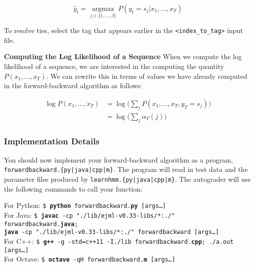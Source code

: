 \documentclass[11pt,addpoints,answers]{exam}
\numberwithin{equation}{section} %
\numberwithin{figure}{section} %
\numberwithin{table}{section} %
\newcommand \argmax {\operatorname*{argmax}}
\begin{document}
$$\hat{y}_t = \argmax_{j\in \{1,...,J\}} P(y_t = s_j\vert x_1,...,x_T)$$

To resolve ties, select the tag that appears earlier in the \texttt{<index\_to\_tag>} input file.

\textbf{Computing the Log Likelihood of a Sequence}
When we compute the log likelihood of a sequence, we are interested in the computing the quantity $P(x_1,...,x_T)$. We can rewrite this in terms of values we have already computed in the forward-backward algorithm as follows:

\begin{align*}
    \log P(x_1,...,x_T) &= \log\big(\sum_j P(x_1,...,x_T,y_T=s_j)\big)\\
    &= \log\big(\sum_j \alpha_T(j)\big)
\end{align*}

\subsubsection{Implementation Details}

You should now implement your forward-backward algorithm as a program, \texttt{forwardbackward.\{py|java|cpp|m\}}. The program will read in test data and the parameter files produced by \texttt{learnhmm.\{py|java|cpp|m\}}. The autograder will use the following commands to call your function:

\begin{tabbing}
For Python: \=\texttt{\$ \textbf{python} forwardbackward.\textbf{py} [args\dots]}\\
For Java: \>\texttt{\$ \textbf{javac} -cp "./lib/ejml-v0.33-libs/*:./" forwardbackward.\textbf{java};\\ \>  \texttt{\textbf{java} -cp "./lib/ejml-v0.33-libs/*:./" forwardbackward [args\dots]}}\\
For C++: \>\texttt{\$ \textbf{g++} -g -std=c++11 -I./lib forwardbackward.\textbf{cpp}; ./a.out [args\dots]}\\
For Octave: \>\texttt{\$ \textbf{octave} -qH forwardbackward.\textbf{m} [args\dots]}
\end{tabbing}
\end{document}
